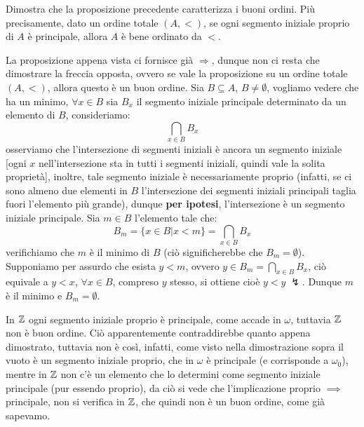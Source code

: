 \begin{exercise}
	Dimostra che la proposizione precedente caratterizza i buoni ordini. Più precisamente, dato un ordine totale $(A,<)$, se ogni segmento iniziale proprio di $A$
	è principale, allora $A$ è bene ordinato da $<$.
\end{exercise}

\begin{soln}
	La proposizione appena vista ci fornisce già $\Longrightarrow$, dunque non ci resta che dimostrare la freccia opposta, ovvero se vale la proposizione su un ordine totale $(A,<)$, allora questo è un buon ordine.
	Sia $B \subseteq A$, $B \ne \emptyset$, vogliamo vedere che ha un minimo, $\forall x \in B$ sia $B_x$ il segmento iniziale principale determinato da un elemento di $B$, consideriamo:
	\[ \bigcap_{x \in B} B_x
		\]
	osserviamo che l'intersezione di segmenti iniziali è ancora un segmento iniziale [ogni $x$ nell'intersezione sta in tutti i segmenti iniziali, quindi vale la solita proprietà], inoltre, tale segmento iniziale è necessariamente proprio
	(infatti, se ci sono almeno due elementi in $B$ l'intersezione dei segmenti iniziali principali taglia fuori l'elemento più grande), dunque \textbf{per ipotesi}, l'intersezione è un segmento iniziale principale. Sia $m \in B$ l'elemento tale che:
	\[ B_m = \{x \in B | x < m\} = \bigcap_{x \in B} B_x
		\]
	verifichiamo che $m$ è il minimo di $B$ (ciò significherebbe che $B_m = \emptyset$). Supponiamo per assurdo che esista $y < m$, ovvero $y \in B_m = \bigcap_{x \in B} B_x$, ciò equivale a $y < x$, $\forall x \in B$, compreso $y$ stesso, si ottiene cioè $y < y \; \lightning$.
	Dunque $m$ è il minimo e $B_m = \emptyset$.
\end{soln}

\begin{remark}
	In $\mathbb Z$ ogni segmento iniziale proprio è principale, come accade in $\omega$, tuttavia $\mathbb Z$ non è buon ordine. Ciò apparentemente contraddirebbe quanto appena dimostrato,
	tuttavia non è così, infatti, come visto nella dimostrazione sopra il vuoto è un segmento iniziale proprio, che in $\omega$ è principale (e corrisponde a $\omega_0$), mentre in $\mathbb Z$ non c'è un elemento che lo determini come 
	segmento iniziale principale (pur essendo proprio), da ciò si vede che l'implicazione proprio $\implies$ principale, non si verifica in $\mathbb Z$, che quindi non è un buon ordine, come già sapevamo. 
\end{remark}

